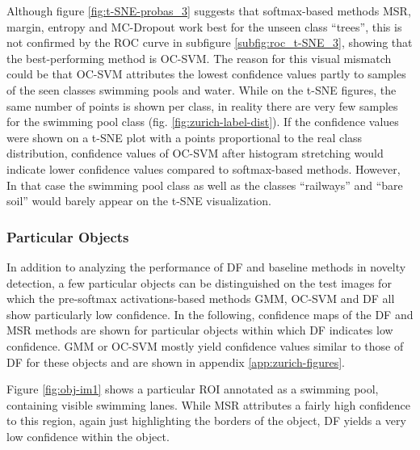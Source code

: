 \documentclass[10pt]{article}
\begin{document}
\restoregeometry


Although figure \ref{fig:t-SNE-probas_3} suggests that softmax-based methods \gls{MSR}, margin, entropy and \gls{MC-Dropout} work best for the unseen class ``trees'', this is not confirmed by the \gls{ROC} curve in subfigure  \ref{subfig:roc_t-SNE_3}, showing that the best-performing method is \gls{OC-SVM}. The reason for this visual mismatch could be that \gls{OC-SVM} attributes the lowest confidence values partly to samples of the seen classes swimming pools and water. While on the \gls{t-SNE} figures, the same number of points is shown per class, in reality there are very few samples for the swimming pool class (fig. \ref{fig:zurich-label-dist}). If the confidence values were shown on a t-SNE plot with a points proportional to the real class distribution, confidence values of \gls{OC-SVM} after histogram stretching would indicate lower confidence values compared to softmax-based methods. However, In that case the swimming pool class as well as the classes ``railways'' and ``bare soil'' would barely appear on the \gls{t-SNE} visualization. 

\subsubsection{Particular Objects}
In addition to analyzing the performance of \acrlong{DF} and baseline methods in novelty detection, a few particular objects can be distinguished on the test images for which the pre-softmax activations-based methods \gls{GMM}, \gls{OC-SVM} and \acrlong{DF} all show particularly low confidence. In the following, confidence maps of the \acrlong{DF} and \gls{MSR} methods are shown for particular objects within which \acrlong{DF} indicates low confidence. \gls{GMM} or \gls{OC-SVM} mostly yield confidence values similar to those of \acrlong{DF} for these objects and are shown in appendix \ref{app:zurich-figures}.

Figure \ref{fig:obj-im1} shows a particular \gls{ROI} annotated as a swimming pool, containing visible swimming lanes. While \gls{MSR} attributes a fairly high confidence to this region, again just highlighting the borders of the object, \gls{DF} yields a very low confidence within the object.
\end{document}
